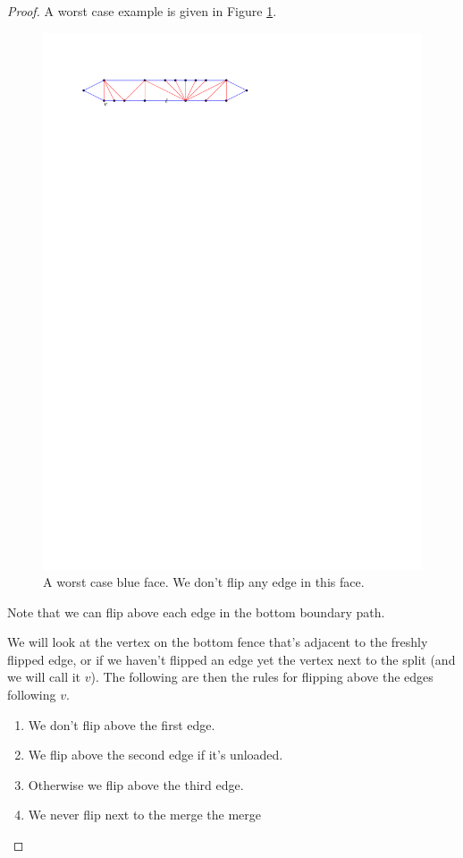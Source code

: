 \begin{proof}
  A worst case example is given in Figure \ref{fig:subdiv:worstCase}.

  \begin{figure}[h]
    \centering
    \includegraphics[scale=1]{blueFaceSubdivision/img/worstCase}
    \caption{A worst case blue face. We don't flip any edge in this face.}
    \label{fig:subdiv:worstCase}
  \end{figure}

  Note that we can flip above each edge in the bottom boundary path.

  We will look at the vertex on the bottom fence that's adjacent to the freshly flipped edge,  or if we haven't flipped an edge yet the vertex next to the split (and we will call it $v$). The following are then the rules for flipping above the edges following $v$.
  \begin{enumerate}
    \item We don't flip above the first edge.
    \item We flip above the second edge if it's unloaded.
    \item Otherwise we flip above the third edge.
    \item We never flip next to the merge the merge
  \end{enumerate}


\end{proof}
